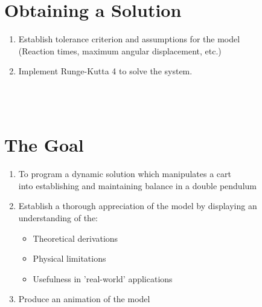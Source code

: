 \documentclass{report}
\begin{document}
\section*{Obtaining a Solution}

\begin{enumerate}

\item Establish tolerance criterion and assumptions for the model \\(Reaction times, maximum angular displacement, etc.)

\item Implement Runge-Kutta 4 to solve the system.


\end{enumerate}


\\
\\



\section*{The Goal}

\begin{enumerate}

\item To program a dynamic solution which manipulates a cart 
\\into establishing and maintaining balance in a double pendulum

\item Establish a thorough appreciation of the model by displaying an understanding of the:

	\begin{itemize}

\item Theoretical derivations

\item Physical limitations

\item Usefulness in 'real-world' applications

\end{itemize}

\item Produce an animation of the model

\end{enumerate}
\end{document}
